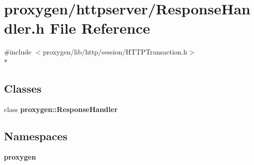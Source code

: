 \section{proxygen/httpserver/\+Response\+Handler.h File Reference}
\label{ResponseHandler_8h}
{\ttfamily \#include $<$proxygen/lib/http/session/\+H\+T\+T\+P\+Transaction.\+h$>$}\\*
\subsection*{Classes}
\begin{DoxyCompactItemize}
\item 
class {\bf proxygen\+::\+Response\+Handler}
\end{DoxyCompactItemize}
\subsection*{Namespaces}
\begin{DoxyCompactItemize}
\item 
 {\bf proxygen}
\end{DoxyCompactItemize}
